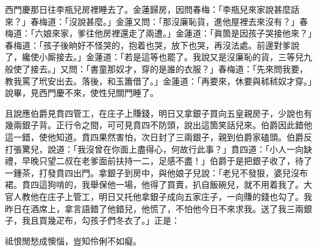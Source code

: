 西門慶那日往李瓶兒房裡睡去了。金蓮歸房，因問春梅：「李瓶兒來家說甚麼話來？」春梅道：「沒說甚麼。」金蓮又問：「那沒廉恥貨，進他屋裡去來沒有？」春梅道：「六娘來家，爹往他房裡還走了兩遭。」金蓮道：「眞箇是因孩子哭接他來？」春梅道：「孩子後晌好不怪哭的，抱着也哭，放下也哭，再沒法處。前邊對爹說了，纔使小厮接去。」金蓮道：「若是這等也罷了。我說又是沒廉恥的貨，三等兒九般使了接去。」又問：「書童那奴才，穿的是誰的衣服？」春梅道：「先來問我要，教我罵了玳安出去。落後，和玉簫借了。」金蓮道：「再要來，休要與秫秫奴才穿。」說畢，見西門慶不來，使性兒關門睡了。

且說應伯爵見賁四管工，在庄子上賺錢，明日又拿銀子買向五皇親房子，少說也有幾兩銀子背。正行令之間，可可見賁四不防頭，說出這箇笑話兒來。伯爵因此錯他這一錯，使他知道。賁四果然害怕，次日封了三兩銀子，親到伯爵家磕頭。伯爵反打張驚兒，說道：「我沒曾在你面上盡得心，何故行此事？」賁四道：「小人一向缺禮，早晚只望二叔在老爹面前扶持一二，足感不盡！」伯爵于是把銀子收了，待了一鍾茶，打發賁四出門。拿銀子到房中，與他娘子兒說：「老兒不發狠，婆兒沒布裙。賁四這狗啃的，我舉保他一場，他得了買賣，扒自飯碗兒，就不用着我了。大官人教他在庄子上管工，明日又托他拿銀子成向五家庄子，一向賺的錢也勾了。我昨日在酒席上，拿言語錯了他錯兒，他慌了，不怕他今日不來求我。送了我三兩銀子，我且買幾疋布，勾孩子們冬衣了。」正是：

\begin{myquote} 
祗恨閒愁成懊惱，豈知伶俐不如癡。
\end{myquote} 

